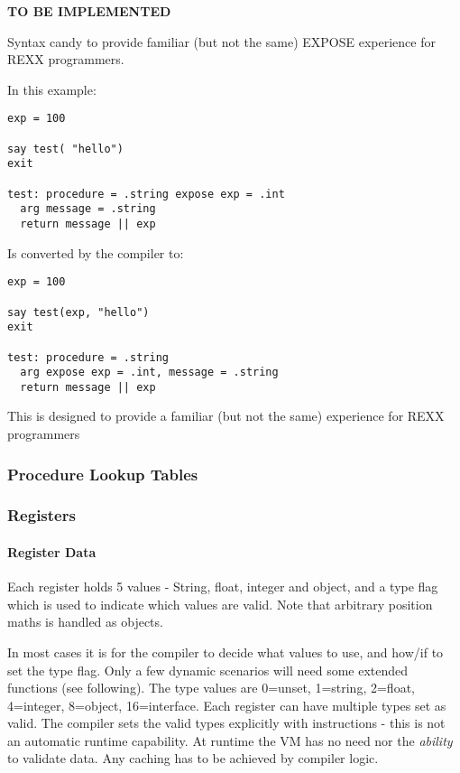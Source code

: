 \textbf{TO BE IMPLEMENTED}

Syntax candy to provide familiar (but not the same) EXPOSE experience
for REXX programmers.

In this example:

\begin{verbatim}
exp = 100

say test( "hello")
exit

test: procedure = .string expose exp = .int
  arg message = .string
  return message || exp
\end{verbatim}

Is converted by the compiler to:

\begin{verbatim}
exp = 100

say test(exp, "hello")
exit

test: procedure = .string 
  arg expose exp = .int, message = .string
  return message || exp
\end{verbatim}

This is designed to provide a familiar (but not the same) experience for
REXX programmers

\hypertarget{procedure-lookup-tables}{%
\subsubsection{Procedure Lookup Tables}\label{procedure-lookup-tables}}

\hypertarget{registers}{%
\subsubsection{Registers}\label{registers}}

\hypertarget{register-data}{%
\paragraph{Register Data}\label{register-data}}

Each register holds 5 values - String, float, integer and object, and a
type flag which is used to indicate which values are valid. Note that
arbitrary position maths is handled as objects.

In most cases it is for the compiler to decide what values to use, and
how/if to set the type flag. Only a few dynamic scenarios will need some
extended functions (see following). The type values are 0=unset,
1=string, 2=float, 4=integer, 8=object, 16=interface. Each register can
have multiple types set as valid. The compiler sets the valid types
explicitly with instructions - this is not an automatic runtime
capability. At runtime the VM has no need nor the \emph{ability} to
validate data. Any caching has to be achieved by compiler logic.

